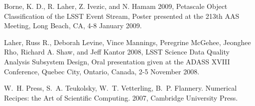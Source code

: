 \begin{thebibliography}{}

 Borne, K. D., R. Laher, Z. Ivezic, and N. Hamam 2009,
   Petascale Object Classification of the LSST Event Stream, 
   Poster presented at the 213th AAS Meeting, Long Beach, CA, 4-8 January 2009.

 Laher, Russ R., Deborah Levine, Vince Mannings, 
   Peregrine McGehee, Jeonghee Rho, Richard A. Shaw, and Jeff Kantor 2008,
   LSST Science Data Quality Analysis Subsystem Design,
   Oral presentation given at the ADASS XVIII Conference, Quebec City, Ontario, Canada, 
   2-5 November 2008.

W.~H. Press,  S.~A. Teukolsky, W.~T. Vetterling, B.~P. Flannery.
Numerical Recipes: the Art of Scientific Computing.
2007, Cambridge University Press.
   
\end{thebibliography}
